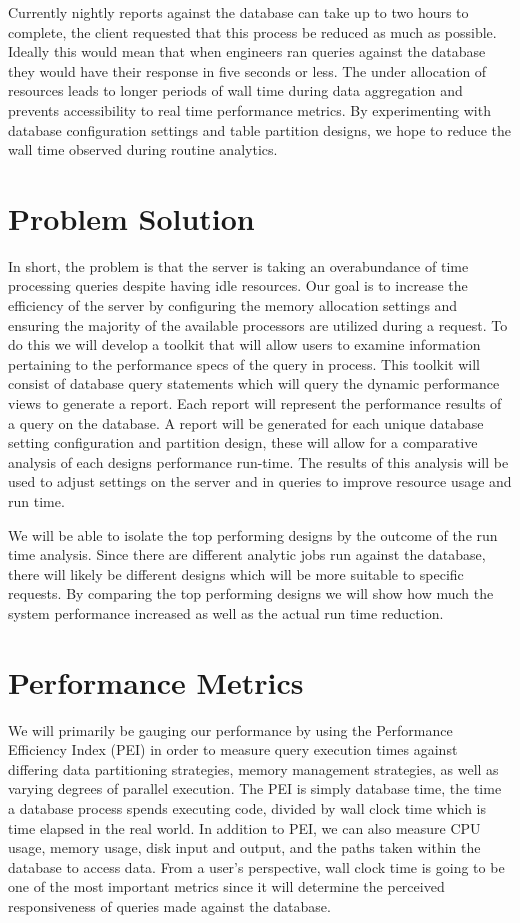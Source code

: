 \documentclass[draftclsnofoot, onecolumn, 10pt]{IEEEtran}
\begin{document}
Currently nightly reports against the database can take up to two hours to complete, the client requested that this process be reduced as much as possible.
Ideally this would mean that when engineers ran queries against the database they would have their response in five seconds or less.
The under allocation of resources leads to longer periods of wall time during data aggregation and prevents accessibility to real time performance metrics.
By experimenting with database configuration settings and table partition designs, we hope to reduce the wall time observed during routine analytics.

\vspace{0.5 in}

\section*{Problem Solution}
In short, the problem is that the server is taking an overabundance of time processing queries despite having idle resources.
Our goal is to increase the efficiency of the server by configuring the memory allocation settings and ensuring the majority of the available processors are utilized during a request.
To do this we will develop a toolkit that will allow users to examine information pertaining to the performance specs of the query in process.
This toolkit will consist of database query statements which will query the dynamic performance views to generate a report.
Each report will represent the performance results of a query on the database.
A report will be generated for each unique database setting configuration and partition design, these will allow for a comparative analysis of each designs performance run-time.
The results of this analysis will be used to adjust settings on the server and in queries to improve resource usage and run time. 


We will be able to isolate the top performing designs by the outcome of the run time analysis.
Since there are different analytic jobs run against the database, there will likely be different designs which will be more suitable to specific requests.
By comparing the top performing designs we will show how much the system performance increased as well as the actual run time reduction.  

\section*{Performance Metrics}
We will primarily be gauging our performance by using the Performance Efficiency Index (PEI) in order to measure query execution times against differing data partitioning strategies, memory management strategies, as well as varying degrees of parallel execution.
The PEI is simply database time, the time a database process spends executing code, divided by wall clock time which is time elapsed in the real world.
In addition to PEI, we can also measure CPU usage, memory usage, disk input and output, and the paths taken within the database to access data.
From a user’s perspective, wall clock time is going to be one of the most important metrics since it will determine the perceived responsiveness of queries made against the database.
\end{document}
